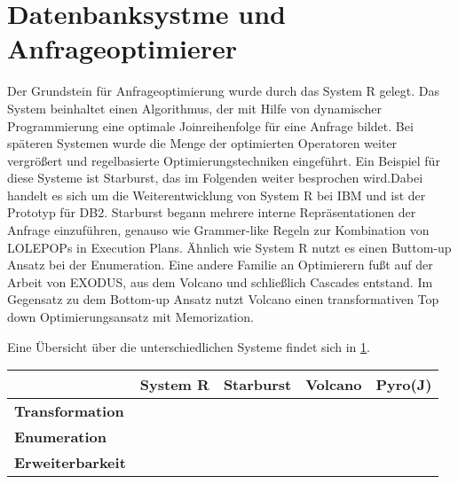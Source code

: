 








\section{Datenbanksystme und Anfrageoptimierer}

Der Grundstein für Anfrageoptimierung wurde durch das System R gelegt. Das System beinhaltet einen Algorithmus, der mit Hilfe von dynamischer Programmierung eine optimale Joinreihenfolge für eine Anfrage bildet. Bei späteren Systemen  wurde die Menge der optimierten Operatoren weiter vergrößert und regelbasierte Optimierungstechniken eingeführt. Ein Beispiel für diese Systeme ist Starburst, das im Folgenden weiter besprochen wird.Dabei handelt es sich um die Weiterentwicklung von System R bei IBM und ist der Prototyp für DB2. Starburst begann mehrere interne Repräsentationen der Anfrage einzuführen, genauso wie Grammer-like Regeln zur Kombination von LOLEPOPs in Execution Plans. Ähnlich wie System R nutzt es einen Buttom-up Ansatz bei der Enumeration. Eine andere Familie an Optimierern fußt auf der Arbeit von  EXODUS, aus dem Volcano und schließlich Cascades entstand. Im Gegensatz zu dem Bottom-up Ansatz nutzt Volcano einen transformativen Top down Optimierungsansatz mit Memorization.


Eine Übersicht über die unterschiedlichen Systeme findet sich in \ref{DatabasesOverview}.
\begin{table}[h]
\begin{tabular}{|l|l|l|l|l|}
\hline
{\bf }                & {\bf System R} & {\bf Starburst} & {\bf Volcano} & {\bf Pyro(J)} \\ \hline
{\bf Transformation}  &                &                 &               &               \\ \hline
{\bf Enumeration}     &                &                 &               &               \\ \hline
{\bf Erweiterbarkeit} &                &                 &               &               \\ \hline
\end{tabular}
\label{DatabasesOverview}
\end{table}








